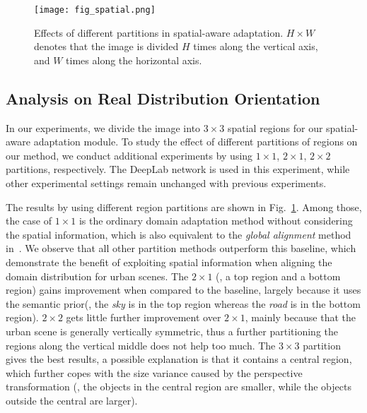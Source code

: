 \documentclass[10pt,twocolumn,letterpaper]{article}
\begin{document}
\begin{figure}
\centering
\texttt{[image: fig\_spatial.png]}
\caption{Effects of different partitions in spatial-aware adaptation. $H\times W$ denotes that the image is divided $H$ times along the vertical axis, and $W$ times along the horizontal axis.}
\label{fig:spatial}
\vspace{-4mm}
\end{figure}

\subsection{Analysis on Real Distribution Orientation}
\label{sec:exp_rdo}
In our experiments, we divide the image into $3 \times 3$ spatial regions for our spatial-aware adaptation module. To study the effect of different partitions of regions on our method, we conduct additional experiments by using $1 \times 1$, $2\times 1$, $2\times 2$ partitions, respectively. The DeepLab network is used in this experiment, while other experimental settings remain unchanged with previous experiments. 

The results by using different region partitions are shown in Fig.~\ref{fig:spatial}. Among those, the case of $1 \times 1$ is the ordinary domain adaptation method without considering the spatial information, which is also equivalent to the \textit{global alignment} method in~\cite{hoffman2016fcns}. We observe that all other partition methods outperform this baseline, which demonstrate the benefit of exploiting spatial information when aligning the domain distribution for urban scenes. The $2 \times 1$ (\ie, a top region and a bottom region) gains improvement when compared to the baseline, largely because it uses the semantic prior(\eg, the \textit{sky} is in the top region whereas the \textit{road} is in the bottom region). $2 \times 2$ gets little further improvement over $2 \times 1$,  mainly because that the urban scene is generally vertically symmetric, thus a further partitioning the regions along the vertical middle does not help too much. The $3 \times 3$ partition gives the best results, a possible explanation is that it contains a central region, which further copes with the size variance caused by the perspective transformation (\eg, the objects in the central region are smaller, while the objects outside the central are larger).
\end{document}
